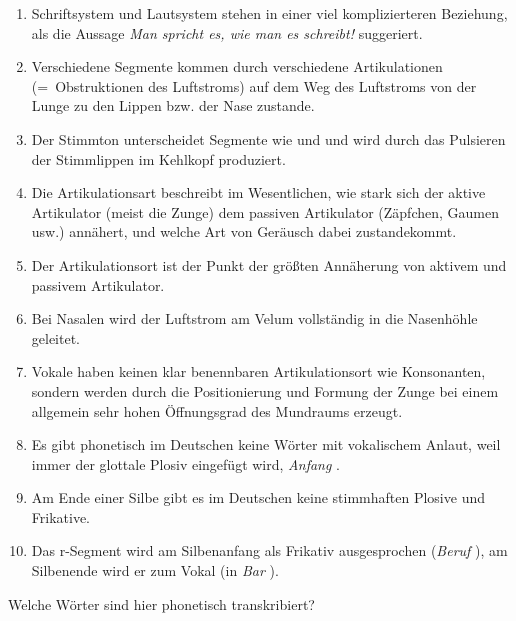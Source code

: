 \begin{enumerate}
  \item Schriftsystem und Lautsystem stehen in einer viel komplizierteren Beziehung, als die Aussage \textit{Man spricht es, wie man es schreibt!} suggeriert.
  \item Verschiedene Segmente kommen durch verschiedene Artikulationen (=~Obstruktionen des Luftstroms) auf dem Weg des Luftstroms von der Lunge zu den Lippen bzw. der Nase zustande.
  \item Der Stimmton unterscheidet Segmente wie \textipa{[t]} und \textipa{[d]} und wird durch das Pulsieren der Stimmlippen im Kehlkopf produziert.
  \item Die Artikulationsart beschreibt im Wesentlichen, wie stark sich der aktive Artikulator (meist die Zunge) dem passiven Artikulator (Zäpfchen, Gaumen usw.) annähert, und welche Art von Geräusch dabei zustandekommt.
  \item Der Artikulationsort ist der Punkt der größten Annäherung von aktivem und passivem Artikulator.
  \item Bei Nasalen wird der Luftstrom am Velum vollständig in die Nasenhöhle geleitet.
  \item Vokale haben keinen klar benennbaren Artikulationsort wie Konsonanten, sondern werden durch die Positionierung und Formung der Zunge bei einem allgemein sehr hohen Öffnungsgrad des Mundraums erzeugt.
  \item Es gibt phonetisch im Deutschen keine Wörter mit vokalischem Anlaut, weil immer der glottale Plosiv \textipa{[P]} eingefügt wird, \zB \textit{Anfang} \textipa{[PanfaN]}.
  \item Am Ende einer Silbe gibt es im Deutschen keine stimmhaften Plosive und Frikative.
  \item Das r-Segment wird am Silbenanfang als Frikativ ausgesprochen (\zB \textit{Beruf} \textipa{[b@Ku:f]}), am Silbenende wird er zum Vokal (\zB in \textit{Bar} \textipa{[b\t{a@}]}).
\end{enumerate}

\Uebungen

\Uebung[\onestar] \label{u31} Welche Wörter sind hier phonetisch transkribiert?

